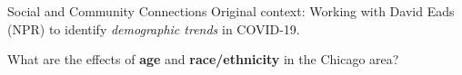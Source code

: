 \begin{slide}{Social and Community Connections}
	{\large Original context:} Working with David Eads (NPR) to identify \textit{demographic trends} in COVID-19. \\
	
	\vspace{.2cm}
	
	What are the effects of \textbf{age} and \textbf{race/ethnicity} in the Chicago area?
\end{slide}